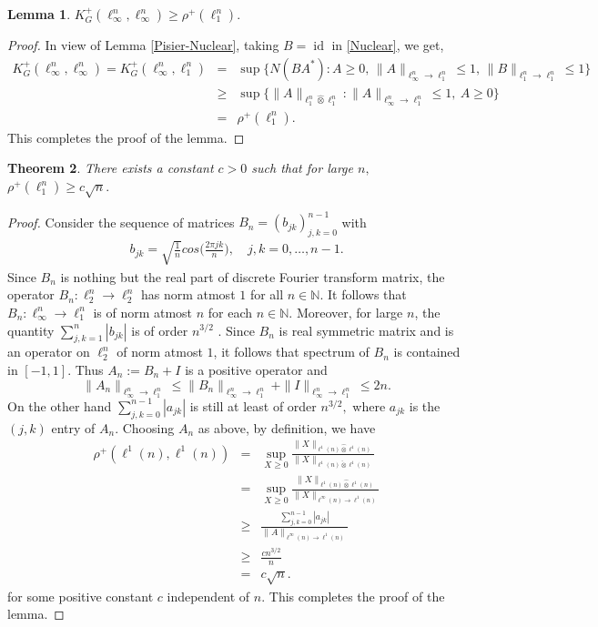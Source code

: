 \documentclass[a4paper,oneside,11pt, reqno]{amsart}
\numberwithin{equation}{section}
\newtheorem{theorem}{Theorem}[section]
\newtheorem{lemma}[theorem]{Lemma}
\theoremstyle{plain}
\begin{document}
\begin{lemma}%
$K_G^+(\ell_\infty^n,\ell_\infty^n)\geqslant \rho^+(\ell_1^n).$
\end{lemma}
\begin{proof}
In view of Lemma \ref{Pisier-Nuclear}, taking $B=\operatorname{id}$ in \eqref{Nuclear}, we get,
\begin{eqnarray*}%
K_G^+(\ell_\infty^n,\ell_\infty^n)= K_G^+(\ell_\infty^n,\ell_1^n)&=& \sup \{N(BA^*): A\geqslant 0,\, \|A\|_{\ell_\infty^n\to \ell_1^n}\leqslant 1,\, \|B\|_{\ell_1^n \to\ell_1^n}\leqslant 1\}\\
&\geqslant &\sup\{\|A\|_{\ell_1^n\hat{\otimes}\ell_1^n}: \|A\|_{\ell_\infty^n \to\ell_1^n}\leqslant 1, \ A\geqslant 0\}\\
&=&\rho^{+}(\ell_1^n).
\end{eqnarray*}
This completes the proof of the lemma.
\end{proof}
\begin{theorem}\label{rho+-1-1}
There exists a constant $c>0$ such that for large $n,$ $\rho^+(\ell_1^n)\geqslant c\sqrt{n}.$
\end{theorem}
\begin{proof}
Consider the sequence of matrices $B_n=(b_{jk})_{j,k=0}^{n-1}$ with 
\begin{eqnarray*}%
b_{jk}=\sqrt{\frac{1}{n}}cos \big(\frac{2\pi jk}{n}\big), \quad j,k=0,\ldots, n-1.
\end{eqnarray*}  
Since $B_n$ is nothing but the real part of discrete Fourier transform matrix, the operator $B_n:\ell_2^n\to \ell_2^n$ has norm atmost $1$ for all $n\in\mathbb N.$ It follows that $B_n:\ell_\infty^n \to \ell_1^n$ is of norm atmost $n$ for each $n\in\mathbb N$. 
Moreover, for large $n$, the quantity $\sum_{j,k=1}^{n}|b_{jk}|$ is of order $n^{3/2}$ \cite{Pinelis}. 
Since $B_n$ is real symmetric matrix and is an operator on $\ell_2^n$ of norm atmost $1$, it follows that spectrum of $B_n$ is contained in $[-1,1].$ Thus $A_n:=B_n+I$ is a positive operator and 
$$\|A_n\|_{\ell_\infty^n\to \ell_1^n}\leqslant \|B_n\|_{\ell_\infty^n\to \ell_1^n}+\|I\|_{\ell_\infty^n\to \ell_1^n}\leqslant 2n.$$  
On the other hand $\sum_{j,k=0}^{n-1}|a_{jk}|$ is still at least of order $n^{3/2},$ where $a_{jk}$ is the $(j,k)$ entry of $A_n$. Choosing $A_n$ as above, by definition,  we have
\begin{eqnarray*}
\rho^+(\ell^1(n),\ell^1(n)) &=& \sup_{X\geqslant 0}\frac{\|X\|_{\ell^1(n)\hat{\otimes}\ell^1(n)}}{\|X\|_{\ell^1(n)\check{\otimes}\ell^1(n)}}\\
&=& \sup_{X\geqslant 0}\frac{\|X\|_{\ell^1(n)\hat{\otimes}\ell^1(n)}}{\|X\|_{\ell^\infty(n)\to \ell^1(n)}}\\
&\geqslant & \frac{\sum_{j,k=0}^{n-1} |a_{jk}|}{\|A\|_{\ell^\infty(n)\to \ell^1(n)}}\\
&\geqslant & \frac{cn^{3/2}}{n}\\
&=& c\sqrt{n}.
\end{eqnarray*}
for some positive constant $c$ independent of $n.$
This completes the proof of the lemma.
\end{proof}
\end{document}
